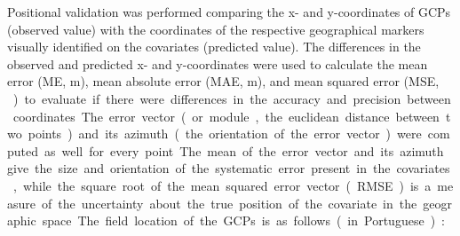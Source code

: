 Positional validation was performed comparing the x- and y-coordinates of GCPs (observed value) with the 
coordinates of the respective geographical markers visually identified on the covariates (predicted value). The 
differences in the observed and predicted x- and y-coordinates were used to calculate the mean error (ME, 
\si{\m}), mean absolute error (MAE, \si{\m}), and mean squared error (MSE, \si{\m\square}) to evaluate if 
there were differences in the accuracy and precision between coordinates. The error vector (or module, the 
euclidean distance between two points) and its azimuth (the orientation of the error vector) were computed as 
well for every point. The mean of the error vector and its azimuth give the size and orientation of the 
systematic error present in the covariates, while the square root of the mean squared error vector (RMSE) is a 
measure of the uncertainty about the true position of the covariate in the geographic space.

The field location of the GCPs is as follows (in Portuguese):

